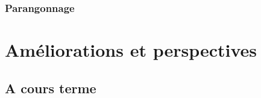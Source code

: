\documentclass[10pt]{report}
\begin{document}
%		


	\subsection{Parangonnage}
	
\chapter{Améliorations et perspectives}
	\section{A cours terme}
\end{document}
